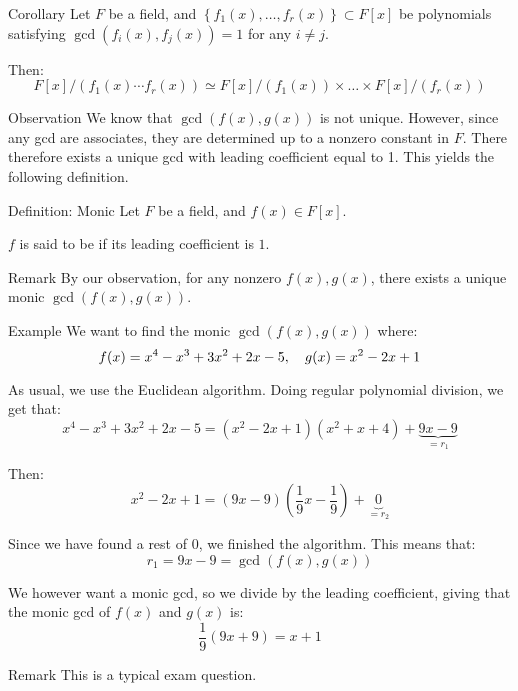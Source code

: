 \documentclass[a4paper]{article}
\begin{document}
\begin{parag}{Corollary}
    Let $F$ be a field, and $\left\{f_1\left(x\right), \ldots, f_r\left(x\right)\right\} \subset F\left[x\right]$ be polynomials satisfying $\gcd\left(f_i\left(x\right), f_j\left(x\right)\right) = 1$ for any $i \neq j$.

    Then:
    \[F\left[x\right] / \left(f_1\left(x\right) \cdots f_r\left(x\right)\right) \simeq F\left[x\right] / \left(f_1\left(x\right)\right) \times \ldots \times F\left[x\right] / \left(f_r\left(x\right)\right)\]
\end{parag}

\begin{parag}{Observation}
    We know that $\gcd\left(f\left(x\right), g\left(x\right)\right)$ is not unique. However, since any gcd are associates, they are determined up to a nonzero constant in $F$. There therefore exists a unique gcd with leading coefficient equal to 1. This yields the following definition.
\end{parag}

\begin{parag}{Definition: Monic}
    Let $F$ be a field, and $f\left(x\right) \in F\left[x\right]$.

    $f$ is said to be  if its leading coefficient is $1$.

    \begin{subparag}{Remark}
        By our observation, for any nonzero $f\left(x\right), g\left(x\right)$, there exists a unique monic $\gcd\left(f\left(x\right), g\left(x\right)\right)$.
    \end{subparag}
\end{parag}

\begin{parag}{Example}
    We want to find the monic $\gcd\left(f\left(x\right), g\left(x\right)\right)$ where: 
    \[f\left(x\right) = x^4 - x^3 + 3x^2 + 2x - 5, \mathspace g\left(x\right) = x^2 - 2x + 1\]
    
    As usual, we use the Euclidean algorithm. Doing regular polynomial division, we get that: 
    \[x^4 - x^3 + 3x^2 + 2x - 5 = \left(x^2 - 2x + 1\right)\left(x^2 + x + 4\right) + \underbrace{9x - 9}_{= r_1}\]
    
    Then: 
    \[x^2 - 2x + 1 = \left(9x - 9\right)\left(\frac{1}{9} x - \frac{1}{9}\right) + \underbrace{0}_{= r_2}\]
    
    Since we have found a rest of 0, we finished the algorithm. This means that: 
    \[r_1 = 9x - 9 = \gcd\left(f\left(x\right), g\left(x\right)\right)\]
    
    We however want a monic gcd, so we divide by the leading coefficient, giving that the monic gcd of $f\left(x\right)$ and $g\left(x\right)$ is: 
    \[\frac{1}{9}\left(9x + 9\right) = x + 1\]

    \begin{subparag}{Remark}
         This is a typical exam question.
    \end{subparag}
\end{parag}
\end{document}
